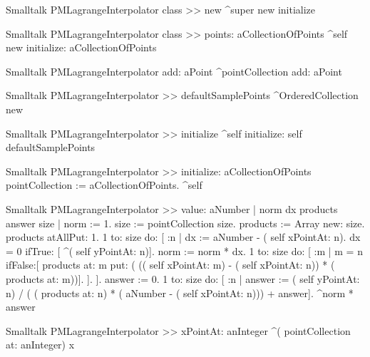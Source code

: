 \begin{displaycode}{Smalltalk}
PMLagrangeInterpolator class >> new
    ^super new initialize
\end{displaycode}

\begin{displaycode}{Smalltalk}
PMLagrangeInterpolator class >> points: aCollectionOfPoints
    ^self new initialize: aCollectionOfPoints
\end{displaycode}

\begin{displaycode}{Smalltalk}
PMLagrangeInterpolator add: aPoint
    ^pointCollection add: aPoint
\end{displaycode}

\begin{displaycode}{Smalltalk}
PMLagrangeInterpolator >> defaultSamplePoints
    ^OrderedCollection new
\end{displaycode}

\begin{displaycode}{Smalltalk}
PMLagrangeInterpolator >> initialize
    ^self initialize: self defaultSamplePoints
\end{displaycode}

\begin{displaycode}{Smalltalk}
PMLagrangeInterpolator >> initialize: aCollectionOfPoints
    pointCollection := aCollectionOfPoints.
    ^self
\end{displaycode}

\begin{displaycode}{Smalltalk}
PMLagrangeInterpolator >> value: aNumber
    | norm dx products answer size |
    norm := 1.
    size := pointCollection size.
    products := Array new: size.
    products atAllPut: 1.
    1 to: size
        do: [ :n |
              dx := aNumber - ( self xPointAt: n).
              dx = 0
                ifTrue: [ ^( self yPointAt: n)].
              norm := norm * dx.
              1 to: size
                do: [ :m |
                      m = n
                        ifFalse:[ products at: m put: ( (( self 
            xPointAt: m) - ( self xPointAt: n)) * ( products at: m))].
                    ].
            ].
    answer := 0.
    1 to: size do:
        [ :n | answer := ( self yPointAt: n) / ( ( products at: n) * 
                          ( aNumber - ( self xPointAt: n))) + answer].
    ^norm * answer
\end{displaycode}

\begin{displaycode}{Smalltalk}
PMLagrangeInterpolator >> xPointAt: anInteger
    ^( pointCollection at: anInteger) x
\end{displaycode}

